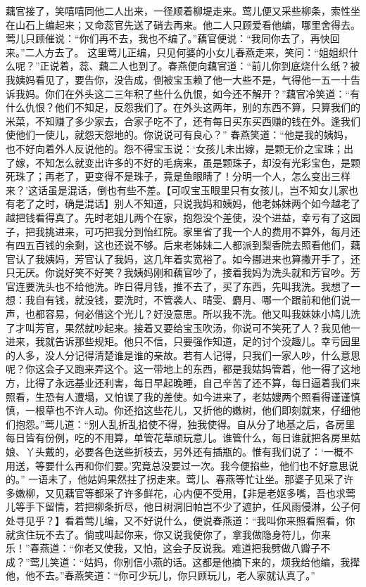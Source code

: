 \documentclass[12pt,oneside]{book}
\begin{document}
藕官接了，笑嘻嘻同他二人出来，一径顺着柳堤走来。莺儿便又采些柳条，索性坐在山石上编起来；又命蕊官先送了硝去再来。他二人只顾爱看他编，哪里舍得去。莺儿只顾催说：“你们再不去，我也不编了。”藕官便说：“我同你去了，再快回来。”二人方去了。
这里莺儿正编，只见何婆的小女儿春燕走来，笑问：“姐姐织什么呢？”正说着，蕊、藕二人也到了。春燕便向藕官道：“前儿你到底烧什么纸？被我姨妈看见了，要告你，没告成，倒被宝玉赖了他一大些不是，气得他一五一十告诉我妈。你们在外头这二三年积了些什么仇恨，如今还不解开？”藕官冷笑道：“有什么仇恨？他们不知足，反怨我们了。在外头这两年，别的东西不算，只算我们的米菜，不知赚了多少家去，合家子吃不了，还有每日买东买西赚的钱在外。逢我们使他们一使儿，就怨天怨地的。你说说可有良心？”
春燕笑道：“他是我的姨妈，也不好向着外人反说他的。怨不得宝玉说：‘女孩儿未出嫁，是颗无价之宝珠；出了嫁，不知怎么就变出许多的不好的毛病来，虽是颗珠子，却没有光彩宝色，是颗死珠了；再老了，更变得不是珠子，竟是鱼眼睛了！分明一个人，怎么变出三样来？’这话虽是混话，倒也有些不差。【可叹宝玉眼里只有女孩儿，岂不知女儿家也有老了之时，确是混话】别人不知道，只说我妈和姨妈，他老姊妹两个如今越老了越把钱看得真了。先时老姐儿两个在家，抱怨没个差使，没个进益，幸亏有了这园子，把我挑进来，可巧把我分到怡红院。家里省了我一个人的费用不算外，每月还有四五百钱的余剩，这也还说不够。后来老姊妹二人都派到梨香院去照看他们，藕官认了我姨妈，芳官认了我妈，这几年着实宽裕了。如今挪进来也算撒开手了，还只无厌。你说好笑不好笑？我姨妈刚和藕官吵了，接着我妈为洗头就和芳官吵。芳官连要洗头也不给他洗。昨日得月钱，推不去了，买了东西，先叫我洗。我想了一想：我自有钱，就没钱，要洗时，不管袭人、晴雯、麝月、哪一个跟前和他们说一声，也都容易，何必借这个光儿？好没意思。所以我不洗。他又叫我妹妹小鸠儿洗了才叫芳官，果然就吵起来。接着又要给宝玉吹汤，你说可不笑死了人？我见他一进来，我就告诉那些规矩。他只不信，只要强作知道，足的讨个没趣儿。幸亏园里的人多，没人分记得清楚谁是谁的亲故。若有人记得，只我们一家人吵，什么意思呢？你这会子又跑来弄这个。这一带地上的东西，都是我姑妈管着，他一得了这地方，比得了永远基业还利害，每日早起晚睡，自己辛苦了还不算，每日逼着我们来照看，生恐有人遭塌，又怕误了我的差使。如今进来了，老姑嫂两个照看得谨谨慎慎，一根草也不许人动。你还掐这些花儿，又折他的嫩树，他们即刻就来，仔细他们抱怨。”莺儿道：“别人乱折乱掐使不得，独我使得。自从分了地基之后，各房里每日皆有份例，吃的不用算，单管花草顽玩意儿。谁管什么，每日谁就把各房里姑娘、丫头戴的，必要各色送些折枝去，另外还有插瓶的。惟有我们说了：‘一概不用送，等要什么再和你们要。’究竟总没要过一次。我今便掐些，他们也不好意思说的。”
一语未了，他姑妈果然拄了拐走来。莺儿、春燕等忙让坐。那婆子见采了许多嫩柳，又见藕官等都采了许多鲜花，心内便不受用，【非是老妪多嘴，吾也求莺儿等手下留情，若把柳条折尽，他日树洞旧帕岂不少了遮护，任风雨侵淋，公子何处寻见乎？】看着莺儿编，又不好说什么，便说春燕道：“我叫你来照看照看，你就贪住玩不去了。倘或叫起你来，你又说我使你了，拿我做隐身符儿，你来乐！”春燕道：“你老又使我，又怕，这会子反说我。难道把我劈做八瓣子不成？”莺儿笑道：“姑妈，你别信小燕的话。这都是他摘下来的，烦我给他编，我撵他，他不去。”春燕笑道：“你可少玩儿，你只顾玩儿，老人家就认真了。”
\end{document}
